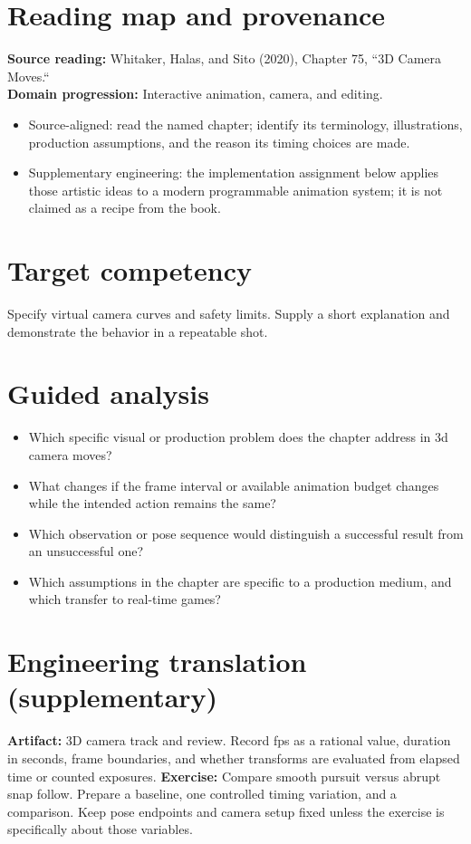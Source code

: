 \documentclass[10pt,letterpaper]{article}
\begin{document}
\makedoctitle
\makedocsummary

\section{Reading map and provenance}
\textbf{Source reading:} Whitaker, Halas, and Sito (2020), Chapter 75, ``3D Camera Moves.``\\
\textbf{Domain progression:} Interactive animation, camera, and editing.
\begin{itemize}
\item Source-aligned: read the named chapter; identify its terminology, illustrations, production assumptions, and the reason its timing choices are made.
\item Supplementary engineering: the implementation assignment below applies those artistic ideas to a modern programmable animation system; it is not claimed as a recipe from the book.
\end{itemize}
\section{Target competency}
Specify virtual camera curves and safety limits. Supply a short explanation and demonstrate the behavior in a repeatable shot.
\section{Guided analysis}
\begin{itemize}
\item Which specific visual or production problem does the chapter address in 3d camera moves?
\item What changes if the frame interval or available animation budget changes while the intended action remains the same?
\item Which observation or pose sequence would distinguish a successful result from an unsuccessful one?
\item Which assumptions in the chapter are specific to a production medium, and which transfer to real-time games?
\end{itemize}
\section{Engineering translation (supplementary)}
\textbf{Artifact:} 3D camera track and review. Record fps as a rational value, duration in seconds, frame boundaries, and whether transforms are evaluated from elapsed time or counted exposures.
\textbf{Exercise:} Compare smooth pursuit versus abrupt snap follow. Prepare a baseline, one controlled timing variation, and a comparison. Keep pose endpoints and camera setup fixed unless the exercise is specifically about those variables.
\end{document}
